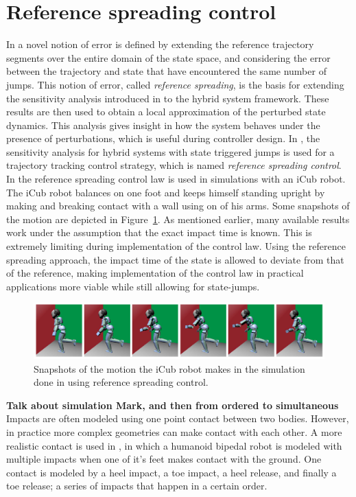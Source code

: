 \documentclass[../DC2017114Bouma.tex]{subfiles}
\begin{document}
\section{Reference spreading control}
In \cite{Saccon2014} a novel notion of error is defined by extending the reference trajectory segments over the entire domain of the state space, and considering the error between the trajectory and state that have encountered the same number of jumps. This notion of error, called \textit{reference spreading}, is the basis for extending the sensitivity analysis introduced in \cite{Khalil1996} to the hybrid system framework. These results are then used to obtain a local approximation of the perturbed state dynamics. This analysis gives insight in how the system behaves under the presence of perturbations, which is useful during controller design. In \cite{Rijnen2016,Rijnen2017}, the sensitivity analysis for hybrid systems with state triggered jumps is used for a trajectory tracking control strategy, which is named \textit{reference spreading control}. In \cite{Rijnen2017a} the reference spreading control law is used in simulations with an iCub robot. The iCub robot balances on one foot and keeps himself standing upright by making and breaking contact with a wall using on of his arms. Some snapshots of the motion are depicted in Figure~\ref{fig:rijnen2017}. As mentioned earlier, many available results work under the assumption that the exact impact time is known. This is extremely limiting during implementation of the control law. Using the reference spreading approach, the impact time of the state is allowed to deviate from that of the reference, making implementation of the control law in practical applications more viable while still allowing for state-jumps.

\begin{figure}[H]
\centering
\includegraphics[width=\textwidth]{rijnen2017.PNG}\caption{Snapshots of the motion the iCub robot makes in the simulation done in \cite{Rijnen2017a} using reference spreading control.}\label{fig:rijnen2017}
\end{figure}

\textbf{Talk about simulation Mark, and then from ordered to simultaneous} Impacts are often modeled using one point contact between two bodies. However, in practice more complex geometries can make contact with each other. A more realistic contact is used in \cite{Zhao2015}, in which a humanoid bipedal robot is modeled with multiple impacts when one of it's feet makes contact with the ground. One contact is modeled by a heel impact, a toe impact, a heel release, and finally a toe release; a series of impacts that happen in a certain order. 
\end{document}
